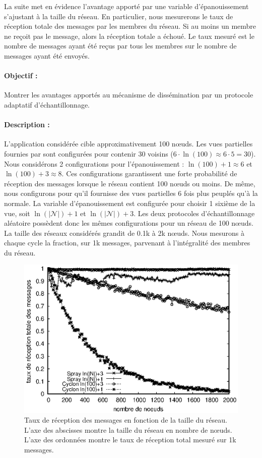 La suite met en évidence l'avantage apporté par une variable d'épanouissement
s'ajustant à la taille du réseau. En particulier, nous mesurerons le taux de
réception totale des messages par les membres du réseau. Si au moins un membre
ne reçoit pas le message, alors la réception totale a échoué. Le taux mesuré est
le nombre de messages ayant été reçus par tous les membres sur le nombre de
messages ayant été envoyés.

\paragraph{Objectif :} Montrer les avantages apportés au mécanisme de
dissémination par un protocole adaptatif d'échantillonnage.

\paragraph{Description :} L'application considérée cible approximativement 100
nœuds. Les vues partielles fournies par \CYCLON sont configurées pour contenir
30 voisins ($6 \cdot \ln(100) \approx 6 \cdot 5 = 30$). Nous considérons 2
configurations pour l'épanouissement : $\ln(100)+1 \approx 6$ et
$\ln(100)+3 \approx 8$. Ces configurations garantissent une forte probabilité de
réception des messages lorsque le réseau contient 100 nœuds ou moins. De même,
nous configurons \SPRAY pour qu'il fournisse des vues partielles 6 fois plus
peuplés qu'à la normale. La variable d'épanouissement est configurée pour
choisir 1 sixième de la vue, soit $\ln(|\mathcal{N}|)+1$ et
$\ln(|\mathcal{N}|)+3$.  Les deux protocoles d'échantillonnage aléatoire
possèdent donc les mêmes configurations pour un réseau de 100 nœuds. La taille
des réseaux considérés grandit de 0.1k à 2k nœuds. Nous mesurons à chaque cycle
la fraction, sur 1k messages, parvenant à l'intégralité des membres du réseau.

\begin{figure}
  \begin{center}
    \includegraphics[width=.8\textwidth]{img/spray/hardrate.eps}
    \caption[Taux de réception des messages en fonction de la taille du
    réseau.]{\label{net:fig:hardrate} Taux de réception des messages en fonction
      de la taille du réseau. L'axe des abscisses montre la taille du réseau en
      nombre de nœuds. L'axe des ordonnées montre le taux de réception total
      mesuré sur 1k messages.}
  \end{center}
\end{figure}

